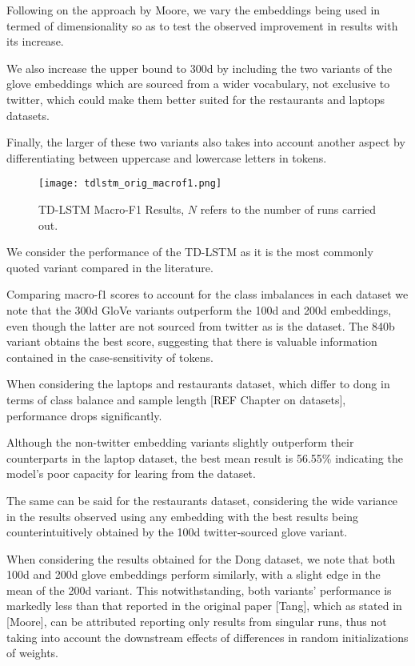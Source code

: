 \documentclass[../../fyp.tex]{subfiles}
\begin{document}
Following on the approach by Moore, we vary the embeddings being used in termed of dimensionality so as to test the observed improvement in results with its increase. 

We also increase the upper bound to 300d by including the two variants of the glove embeddings which are sourced from a wider vocabulary, not exclusive to twitter, which could make them better suited for the restaurants and laptops datasets. 

Finally, the larger of these two variants also takes into account another aspect by differentiating between uppercase and lowercase letters in tokens. 

\begin{figure}[!ht]
	\centering
	\texttt{[image: tdlstm\_orig\_macrof1.png]}
	\caption{TD-LSTM Macro-F1 Results, $N$ refers to the number of runs carried out.}
	\label{fig:ffnn}
\end{figure}

We consider the performance of the TD-LSTM as it is the most commonly quoted variant compared in the literature. 

Comparing macro-f1 scores to account for the class imbalances in each dataset we note that the 300d GloVe variants outperform the 100d and 200d embeddings, even though the latter are not sourced from twitter as is the dataset. The 840b variant obtains the best score, suggesting that there is valuable information contained in the case-sensitivity of tokens.


When considering the laptops and restaurants dataset, which differ to dong in terms of class balance and sample length [REF Chapter on datasets], performance drops significantly. 

Although the non-twitter embedding variants slightly outperform their counterparts in the laptop dataset, the best mean result is 56.55\% indicating the model's poor capacity for learing from the dataset. 

The same can be said for the restaurants dataset, considering the wide variance in the results observed using any embedding with the best results being counterintuitively obtained by the 100d twitter-sourced glove variant.

When considering the results obtained for the Dong dataset, we note that both 100d and 200d glove embeddings perform similarly, with a slight edge in the mean of the 200d variant. This notwithstanding, both variants' performance is markedly less than that reported in the original paper [Tang], which as stated in [Moore], can be attributed reporting only results from singular runs, thus not taking into account the downstream effects of differences in random initializations of weights. 
\end{document}
